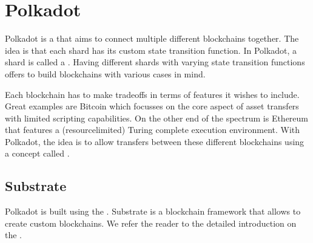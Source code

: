 \documentclass[a4paper,10pt,english]{sphinxmanual}
\begin{document}
\chapter{Polkadot}
\label{\detokenize{intro/polkadot:polkadot}}\label{\detokenize{intro/polkadot:id1}}\label{\detokenize{intro/polkadot::doc}}
Polkadot is a  that aims to connect multiple different blockchains together.
The idea is that each shard has its custom state transition function.
In Polkadot, a shard is called a .
Having different shards with varying state transition functions offers to build blockchains with various cases in mind.

Each blockchain has to make trade\sphinxhyphen{}offs in terms of features it wishes to include. Great examples are Bitcoin which focusses on the core aspect of asset transfers with limited scripting capabilities. On the other end of the spectrum is Ethereum that features a (resource\sphinxhyphen{}limited) Turing complete execution environment.
With Polkadot, the idea is to allow transfers between these different blockchains using a concept called .


\section{Substrate}
\label{\detokenize{intro/polkadot:substrate}}
Polkadot is built using the .
Substrate is a blockchain framework that allows to create custom blockchains.
We refer the reader to the detailed introduction on the .
\end{document}
